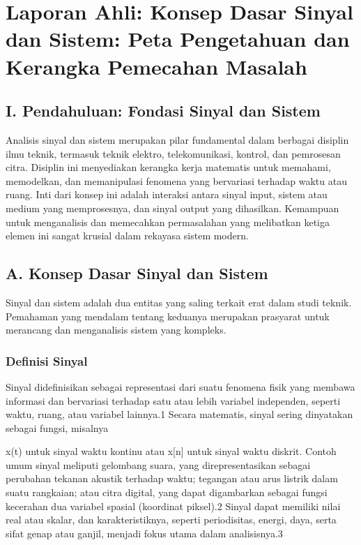 \documentclass[
  letterpaper,
  DIV=11,
  numbers=noendperiod]{scrreprt}
\begin{document}

\chapter{Laporan Ahli: Konsep Dasar Sinyal dan Sistem: Peta Pengetahuan
dan Kerangka Pemecahan
Masalah}\label{laporan-ahli-konsep-dasar-sinyal-dan-sistem-peta-pengetahuan-dan-kerangka-pemecahan-masalah}

\section{I. Pendahuluan: Fondasi Sinyal dan
Sistem}\label{i.-pendahuluan-fondasi-sinyal-dan-sistem}

Analisis sinyal dan sistem merupakan pilar fundamental dalam berbagai
disiplin ilmu teknik, termasuk teknik elektro, telekomunikasi, kontrol,
dan pemrosesan citra. Disiplin ini menyediakan kerangka kerja matematis
untuk memahami, memodelkan, dan memanipulasi fenomena yang bervariasi
terhadap waktu atau ruang. Inti dari konsep ini adalah interaksi antara
sinyal input, sistem atau medium yang memprosesnya, dan sinyal output
yang dihasilkan. Kemampuan untuk menganalisis dan memecahkan
permasalahan yang melibatkan ketiga elemen ini sangat krusial dalam
rekayasa sistem modern.

\section{A. Konsep Dasar Sinyal dan
Sistem}\label{a.-konsep-dasar-sinyal-dan-sistem}

Sinyal dan sistem adalah dua entitas yang saling terkait erat dalam
studi teknik. Pemahaman yang mendalam tentang keduanya merupakan
prasyarat untuk merancang dan menganalisis sistem yang kompleks.

\subsection{Definisi Sinyal}\label{definisi-sinyal}

Sinyal didefinisikan sebagai representasi dari suatu fenomena fisik yang
membawa informasi dan bervariasi terhadap satu atau lebih variabel
independen, seperti waktu, ruang, atau variabel lainnya.1 Secara
matematis, sinyal sering dinyatakan sebagai fungsi, misalnya

x(t) untuk sinyal waktu kontinu atau x{[}n{]} untuk sinyal waktu
diskrit. Contoh umum sinyal meliputi gelombang suara, yang
direpresentasikan sebagai perubahan tekanan akustik terhadap waktu;
tegangan atau arus listrik dalam suatu rangkaian; atau citra digital,
yang dapat digambarkan sebagai fungsi kecerahan dua variabel spasial
(koordinat piksel).2 Sinyal dapat memiliki nilai real atau skalar, dan
karakteristiknya, seperti periodisitas, energi, daya, serta sifat genap
atau ganjil, menjadi fokus utama dalam analisisnya.3
\end{document}
